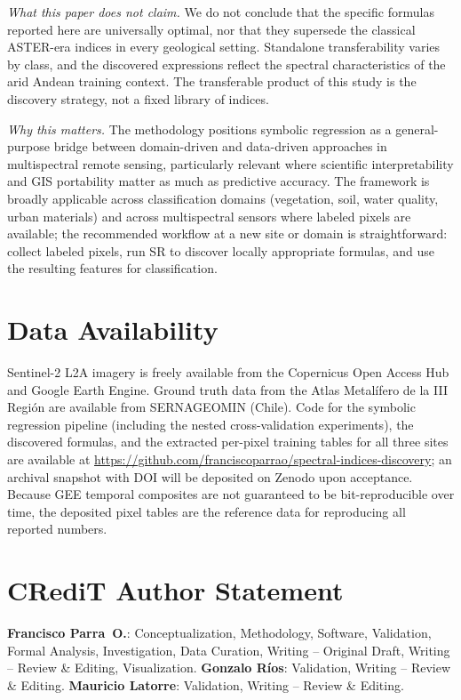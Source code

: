 \documentclass[preprint,authoryear,number]{elsarticle}
\begin{document}
\emph{What this paper does not claim.} We do not conclude that the specific formulas reported here are universally optimal, nor that they supersede the classical ASTER-era indices in every geological setting. Standalone transferability varies by class, and the discovered expressions reflect the spectral characteristics of the arid Andean training context. The transferable product of this study is the discovery strategy, not a fixed library of indices.

\emph{Why this matters.} The methodology positions symbolic regression as a general-purpose bridge between domain-driven and data-driven approaches in multispectral remote sensing, particularly relevant where scientific interpretability and GIS portability matter as much as predictive accuracy. The framework is broadly applicable across classification domains (vegetation, soil, water quality, urban materials) and across multispectral sensors where labeled pixels are available; the recommended workflow at a new site or domain is straightforward: collect labeled pixels, run SR to discover locally appropriate formulas, and use the resulting features for classification.


\section*{Data Availability}

Sentinel-2 L2A imagery is freely available from the Copernicus Open Access Hub and Google Earth Engine. Ground truth data from the Atlas Metal\'ifero de la III Regi\'on are available from SERNAGEOMIN (Chile). Code for the symbolic regression pipeline (including the nested cross-validation experiments), the discovered formulas, and the extracted per-pixel training tables for all three sites are available at \url{https://github.com/franciscoparrao/spectral-indices-discovery}; an archival snapshot with DOI will be deposited on Zenodo upon acceptance. Because GEE temporal composites are not guaranteed to be bit-reproducible over time, the deposited pixel tables are the reference data for reproducing all reported numbers.

\section*{CRediT Author Statement}

\textbf{Francisco Parra~O.}: Conceptualization, Methodology, Software, Validation, Formal Analysis, Investigation, Data Curation, Writing -- Original Draft, Writing -- Review \& Editing, Visualization.
\textbf{Gonzalo R\'ios}: Validation, Writing -- Review \& Editing.
\textbf{Mauricio Latorre}: Validation, Writing -- Review \& Editing.
\end{document}
